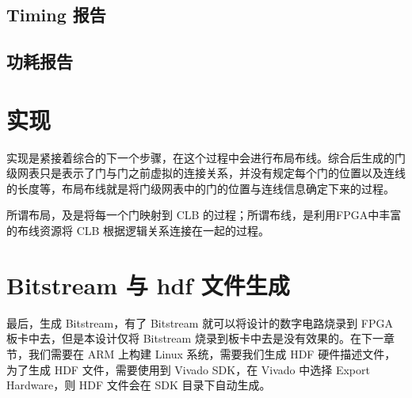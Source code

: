\subsection{Timing 报告}


\subsection{功耗报告}

\section{实现}

实现是紧接着综合的下一个步骤，在这个过程中会进行布局布线。综合后生成的门级网表只是表示了门与门之前虚拟的连接关系，并没有规定每个门的位置以及连线的长度等，布局布线就是将门级网表中的门的位置与连线信息确定下来的过程。

所谓布局，及是将每一个门映射到 CLB 的过程；所谓布线，是利用FPGA中丰富的布线资源将 CLB 根据逻辑关系连接在一起的过程。

\section{Bitstream 与 hdf 文件生成}

最后，生成 Bitstream，有了 Bitstream 就可以将设计的数字电路烧录到 FPGA 板卡中去，但是本设计仅将 Bitstream 烧录到板卡中去是没有效果的。在下一章节，我们需要在 ARM 上构建 Linux 系统，需要我们生成 HDF 硬件描述文件，为了生成 HDF 文件，需要使用到 Vivado SDK，在 Vivado 中选择 Export Hardware，则 HDF 文件会在 SDK 目录下自动生成。








